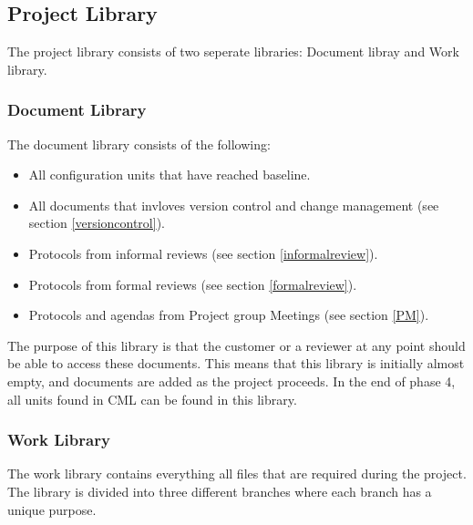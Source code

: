 \documentclass{article}
\begin{document}
    \subsection{Project Library \label{project_library}}
        The project library consists of two seperate libraries: Document libray and Work library.
    
        \subsubsection{Document Library \label{doclibrary}}
            The document library consists of the following:
            
            \begin{itemize}
                \item All configuration units that have reached baseline.
                \item All documents that invloves version control and change management (see                       section \ref{versioncontrol}).
                \item Protocols from informal reviews (see section \ref{informalreview}).
                \item Protocols from formal reviews (see section \ref{formalreview}).
                \item Protocols and agendas from Project group Meetings (see section \ref{PM}).
            \end{itemize}
            \noindent
            The purpose of this library is that the customer or a reviewer at any point should be able to access these documents. 
            This means that this library is initially almost empty, and documents are added as the project proceeds. In the end of phase 4, all units found in CML can be found in this library.

            
        \subsubsection{Work Library}
            The work library contains everything all files that are required during the project.
            The library is divided into three different branches where each branch has a unique purpose.
            
\end{document}
